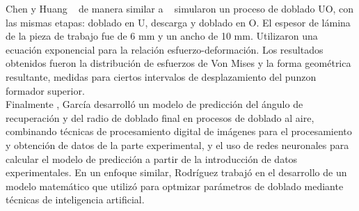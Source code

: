 Chen y Huang ~\cite{chen2007} de manera similar a ~\cite{huang1995} simularon un proceso de doblado 
UO, con las mismas etapas: doblado en U, descarga y doblado en O. El espesor de lámina de la pieza 
de trabajo fue de 6 mm y un ancho de 10 mm. Utilizaron una ecuación exponencial para la relación 
esfuerzo-deformación. Los resultados obtenidos fueron la distribución 
de esfuerzos de Von Mises y la forma geométrica resultante, medidas para ciertos intervalos 
de desplazamiento del punzon formador superior. \\



Finalmente , García \cite{garcia2005} desarrolló un modelo de predicción del ángulo de recuperación y del 
radio de doblado final en procesos de doblado al aire, combinando técnicas de procesamiento digital 
de imágenes para el procesamiento y obtención de datos de la parte experimental, y el uso de redes neuronales 
para calcular el modelo de predicción a partir de la introducción de datos experimentales. En un enfoque 
similar, Rodríguez \cite{rodriguez2014} trabajó en el desarrollo de un modelo matemático que utilizó para 
optmizar parámetros de doblado mediante técnicas de inteligencia artificial.